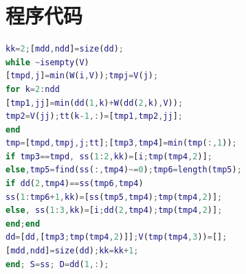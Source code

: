 \documentclass[bwprint]{gmcmthesis}
\numberwithin{figure}{section}
\begin{document}
\newpage
\appendix
\section{程序代码}
\begin{lstlisting}[language=Matlab] 
kk=2;[mdd,ndd]=size(dd);
while ~isempty(V)
[tmpd,j]=min(W(i,V));tmpj=V(j);
for k=2:ndd
[tmp1,jj]=min(dd(1,k)+W(dd(2,k),V));
tmp2=V(jj);tt(k-1,:)=[tmp1,tmp2,jj];
end
tmp=[tmpd,tmpj,j;tt];[tmp3,tmp4]=min(tmp(:,1));
if tmp3==tmpd, ss(1:2,kk)=[i;tmp(tmp4,2)];
else,tmp5=find(ss(:,tmp4)~=0);tmp6=length(tmp5);
if dd(2,tmp4)==ss(tmp6,tmp4)
ss(1:tmp6+1,kk)=[ss(tmp5,tmp4);tmp(tmp4,2)];
else, ss(1:3,kk)=[i;dd(2,tmp4);tmp(tmp4,2)];
end;end
dd=[dd,[tmp3;tmp(tmp4,2)]];V(tmp(tmp4,3))=[];
[mdd,ndd]=size(dd);kk=kk+1;
end; S=ss; D=dd(1,:);
 \end{lstlisting}
\end{document}
